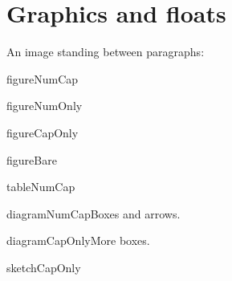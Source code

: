 \flmHeading[toc=true]
\section{Graphics and floats}{\flmLabels{\label{ref1}}}

An image standing between paragraphs:


\begin{flmFloat}{figure}{NumCap}


\caption{A photo with a note, a reference to  and a formula \(x^2\)}\flmLabels{\label{ref2}}\end{flmFloat}

\begin{flmFloat}{figure}{NumOnly}\caption{}\flmLabels{\label{ref3}}\end{flmFloat}

\begin{flmFloat}{figure}{CapOnly}

\caption{A photo of \emph{C}}\end{flmFloat}

\begin{flmFloat}{figure}{Bare}\end{flmFloat}

\begin{flmFloat}{table}{NumCap}

\caption{A table shown as an image}\flmLabels{\label{ref5}}\end{flmFloat}

\begin{flmFloat}{diagram}{NumCap}Boxes and arrows.\caption{Arrows}\flmLabels{\label{ref6}}\end{flmFloat}

\begin{flmFloat}{diagram}{CapOnly}More boxes.\caption{An unlabeled diagram}\end{flmFloat}

\begin{flmFloat}{sketch}{CapOnly}\caption{A sketch}\end{flmFloat}

